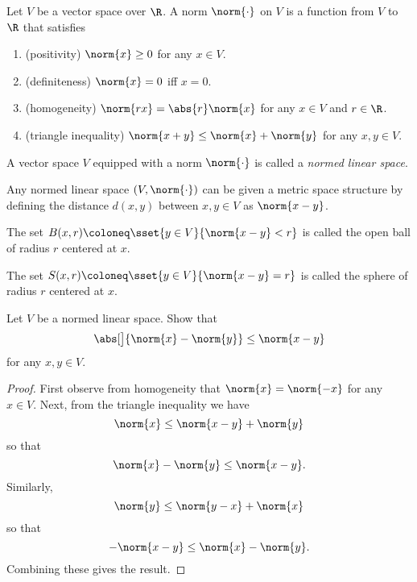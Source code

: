 \begin{definition}[norm] \label{def:norm}
    Let $V$ be a vector space over $\R$.
    A norm $\norm{\cdot}$ on $V$ is a function from $V$ to $\R$ that
    satisfies
    \begin{enumerate}[label=\small(N\arabic*)]
        \item (positivity) $\norm{x} \ge 0$ for any $x \in V$.
            \label{def:norm:pos}
        \item (definiteness) $\norm{x} = 0$ iff $x = 0$.
            \label{def:norm:def}
        \item (homogeneity) $\norm{r x} = \abs{r} \norm{x}$
            for any $x \in V$ and $r \in \R$.
            \label{def:norm:hom}
        \item (triangle inequality) $\norm{x + y} \le \norm{x} + \norm{y}$
            for any $x, y \in V$.
            \label{def:norm:tri}
    \end{enumerate}
\end{definition}

\begin{definition} \label{def:nls}
    A vector space $V$ equipped with a norm $\norm{\cdot}$ is called
    a \emph{normed linear space}.
\end{definition}

\begin{remark}
    Any normed linear space $(V, \norm{\cdot})$ can be given a metric
    space structure by defining the distance $d(x, y)$ between $x, y \in V$
    as $\norm{x - y}$.

    The set $B(x, r) \coloneq \sset{y \in V}{\norm{x - y} < r}$ is called
    the open ball of radius $r$ centered at $x$.

    The set $S(x, r) \coloneq \sset{y \in V}{\norm{x - y} = r}$ is called
    the sphere of radius $r$ centered at $x$.
\end{remark}

\begin{exercise} \label{thm:rti}
    Let $V$ be a normed linear space.
    Show that \begin{equation}
        \abs[\big]{\norm{x} - \norm{y}} \le \norm{x - y}
            \label{eq:rti}
    \end{equation} for any $x, y \in V$.
\end{exercise}
\begin{proof}
    First observe from homogeneity  that
    $\norm{x} = \norm{-x}$ for any $x \in V$.
    Next, from the triangle inequality  we have \[
        \norm{x} \le \norm{x - y} + \norm{y}
    \] so that \[
        \norm{x} - \norm{y} \le \norm{x - y}.
    \] Similarly, \[
        \norm{y} \le \norm{y - x} + \norm{x}
    \] so that \[
        -\norm{x - y} \le \norm{x} - \norm{y}.
    \] Combining these gives the result.
\end{proof}

